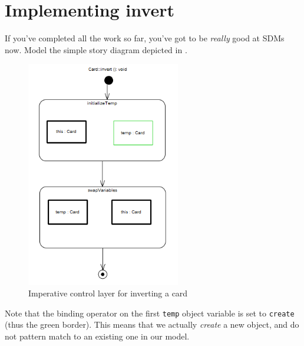 \newpage
\hypertarget{invertCard vis}{}
\section{Implementing invert}
\genHeader

\begin{stepbystep}

\vspace{0.5cm}

\item If you've completed all the work so far, you've got to be \emph{really} good at SDMs now. Model the simple story diagram
depicted in .

\vspace{0.5cm}

\begin{figure}[htbp]
\begin{center}
  \includegraphics[width=0.6\textwidth]{../../org.moflon.doc.handbook.03_storyDiagrams/07_invertCard/visICImages/ea_invertEmpty}
  \caption{Imperative control layer for inverting a card}  
  \label{ea:sdm_invertEmpty}
\end{center}
\end{figure}

\item Note that the binding operator on the first \texttt{temp} object variable is set to \texttt{create} (thus the green
border). This means that we actually \emph{create} a new object, and do not pattern match to an existing one in our model.


\end{stepbystep}
